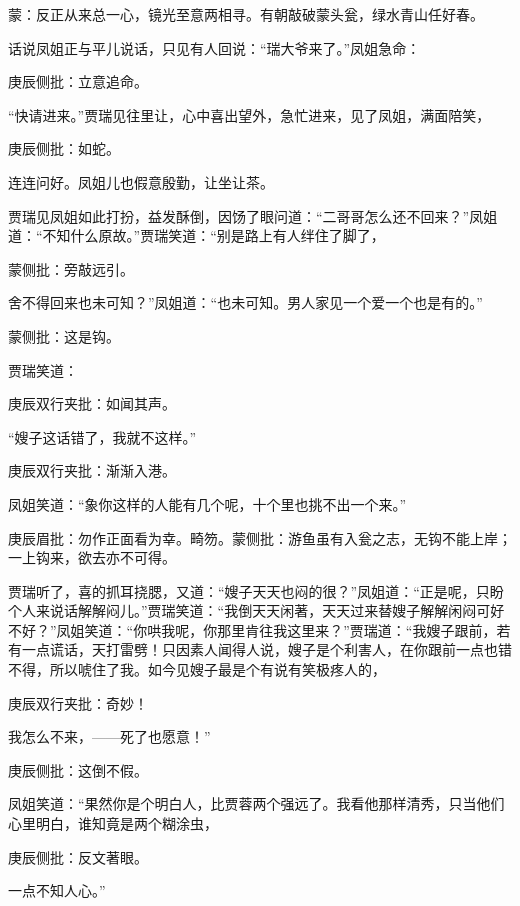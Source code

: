 
\begin{parag}

    \begin{note}蒙：反正从来总一心，镜光至意两相寻。有朝敲破蒙头瓮，绿水青山任好春。\end{note}
\end{parag}

\begin{parag}

    话说凤姐正与平儿说话，只见有人回说：“瑞大爷来了。”凤姐急命：\begin{note}庚辰侧批：立意追命。\end{note}“快请进来。”贾瑞见往里让，心中喜出望外，急忙进来，见了凤姐，满面陪笑，\begin{note}庚辰侧批：如蛇。\end{note}连连问好。凤姐儿也假意殷勤，让坐让茶。
\end{parag}


\begin{parag}


    贾瑞见凤姐如此打扮，益发酥倒，因饧了眼问道：“二哥哥怎么还不回来？”凤姐道：“不知什么原故。”贾瑞笑道：“别是路上有人绊住了脚了，\begin{note}蒙侧批：旁敲远引。\end{note}舍不得回来也未可知？”凤姐道：“也未可知。男人家见一个爱一个也是有的。”\begin{note}蒙侧批：这是钩。\end{note}贾瑞笑道：\begin{note}庚辰双行夹批：如闻其声。\end{note}“嫂子这话错了，我就不这样。”\begin{note}庚辰双行夹批：渐渐入港。\end{note}凤姐笑道：“象你这样的人能有几个呢，十个里也挑不出一个来。”\begin{note}庚辰眉批：勿作正面看为幸。畸笏。蒙侧批：游鱼虽有入瓮之志，无钩不能上岸；一上钩来，欲去亦不可得。\end{note}贾瑞听了，喜的抓耳挠腮，又道：“嫂子天天也闷的很？”凤姐道：“正是呢，只盼个人来说话解解闷儿。”贾瑞笑道：“我倒天天闲著，天天过来替嫂子解解闲闷可好不好？”凤姐笑道：“你哄我呢，你那里肯往我这里来？”贾瑞道：“我嫂子跟前，若有一点谎话，天打雷劈！只因素人闻得人说，嫂子是个利害人，在你跟前一点也错不得，所以唬住了我。如今见嫂子最是个有说有笑极疼人的，\begin{note}庚辰双行夹批：奇妙！\end{note}我怎么不来，——死了也愿意！”\begin{note}庚辰侧批：这倒不假。\end{note}凤姐笑道：“果然你是个明白人，比贾蓉两个强远了。我看他那样清秀，只当他们心里明白，谁知竟是两个糊涂虫，\begin{note}庚辰侧批：反文著眼。\end{note}一点不知人心。”
\end{parag}


